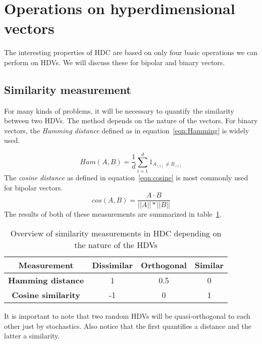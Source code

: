\section{Operations on hyperdimensional vectors}
The interesting properties of HDC are based on only four basic operations we can perform on HDVs. We will discuss these for bipolar and binary vectors.
\subsection{Similarity measurement} \label{sssec:sim}
For many kinds of problems, it will be necessary to quantify the similarity between two HDVs. The method depends on the nature of the vectors. For binary vectors, the \textit{Hamming distance} defined as in equation~\ref{eqn:Hamming} is widely used.

\begin{equation}
    \label{eqn:Hamming}
    Ham(A, B) = \frac{1}{d} \sum_{i=1}^{d} 1_{A_{(i)} \neq B_{(i)}}
\end{equation}
The \textit{cosine distance} as defined in equation~\ref{eqn:cosine} is most commonly used for bipolar vectors.
\begin{equation}
    \label{eqn:cosine}
    cos(A, B) = \frac{A \cdot B}{||A|| * ||B||}
\end{equation}
The results of both of these measurements are summarized in table~\ref{tab:dist}.
\begin{table}[h]
    \caption{\label{tab:dist}Overview of similarity measurements in HDC depending on the nature of the HDVs}
    \begin{tabular}{|c||c|c|c|}
        \hline
        \textbf{Measurement} & \textbf{Dissimilar} & \textbf{Orthogonal} & \textbf{Similar} \\
        \hline
        \textbf{Hamming distance} & 1 & 0.5 & 0 \\
        \hline
        \textbf{Cosine similarity} & -1 & 0 & 1 \\
        \hline
    \end{tabular} 
\end{table}

It is important to note that two random HDVs will be quasi-orthogonal to each other just by stochastics. Also notice that the first quantifies a distance and the latter a similarity.

